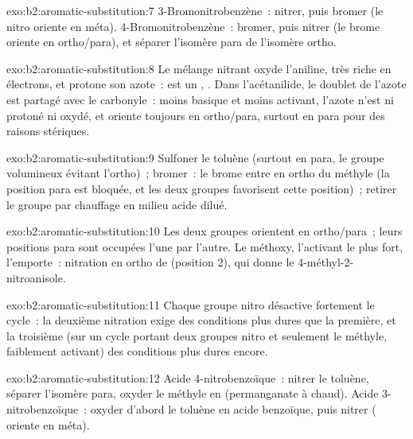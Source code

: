 \begin{solution}{exo:b2:aromatic-substitution:7}
3-Bromonitrobenzène~: nitrer, puis bromer (le nitro oriente en méta). 4-Bromonitrobenzène~:
bromer, puis nitrer (le brome oriente en ortho/para), et séparer l'isomère para de l'isomère
ortho.
\end{solution}

\begin{solution}{exo:b2:aromatic-substitution:8}
Le mélange nitrant oxyde l'aniline, très riche en électrons, et protone son azote~:
 est un , . Dans l'acétanilide, le doublet de l'azote est
partagé avec le carbonyle~: moins basique et moins activant, l'azote n'est ni protoné ni oxydé,
et oriente toujours en ortho/para, surtout en para pour des raisons stériques.
\end{solution}

\begin{solution}{exo:b2:aromatic-substitution:9}
Sulfoner le toluène (surtout en para, le groupe volumineux évitant l'ortho)~; bromer~: le brome entre
en ortho du méthyle (la position para est bloquée, et les deux groupes favorisent cette position)~;
retirer le groupe  par chauffage en milieu acide dilué.
\end{solution}

\begin{solution}{exo:b2:aromatic-substitution:10}
Les deux groupes orientent en ortho/para~; leurs positions para sont occupées l'une par l'autre. Le méthoxy,
l'activant le plus fort, l'emporte~: nitration en ortho de  (position 2), qui donne le
4-méthyl-2-nitroanisole.
\end{solution}

\begin{solution}{exo:b2:aromatic-substitution:11}
Chaque groupe nitro désactive fortement le cycle~: la deuxième nitration exige des conditions plus
dures que la première, et la troisième (sur un cycle portant deux groupes nitro et seulement le méthyle,
faiblement activant) des conditions plus dures encore.
\end{solution}

\begin{solution}{exo:b2:aromatic-substitution:12}
Acide 4-nitrobenzoïque~: nitrer le toluène, séparer l'isomère para, oxyder le méthyle en
 (permanganate à chaud). Acide 3-nitrobenzoïque~: oxyder d'abord le toluène en acide benzoïque, puis
nitrer ( oriente en méta).
\end{solution}

